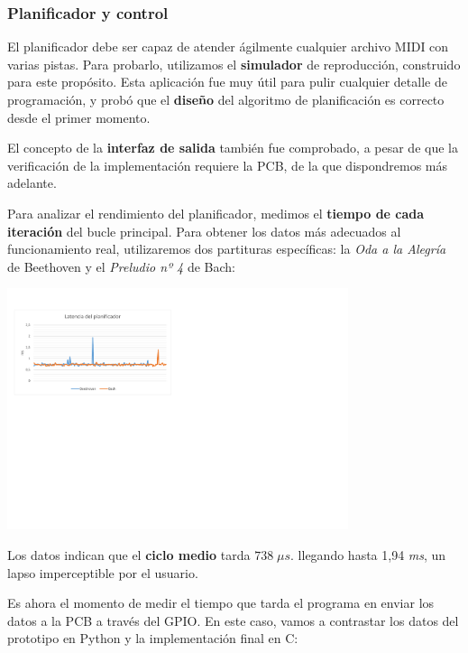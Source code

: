 \documentclass[10pt,a4paper]{article}
\begin{document}
	\subsubsection*{Planificador y control}
	
	El planificador debe ser capaz de atender ágilmente cualquier archivo MIDI con varias pistas. Para probarlo, utilizamos el \textbf{simulador} de reproducción, construido para este propósito. Esta aplicación fue muy útil para pulir cualquier detalle de programación, y probó que el \textbf{diseño} del algoritmo de planificación es correcto desde el primer momento.
	
	El concepto de la \textbf{interfaz de salida} también fue comprobado, a pesar de que la verificación de la implementación requiere la PCB, de la que dispondremos más adelante.
	
	Para analizar el rendimiento del planificador, medimos el \textbf{tiempo de cada iteración} del bucle principal. Para obtener los datos más adecuados al funcionamiento real, utilizaremos dos partituras específicas: la \textit{Oda a la Alegría} de Beethoven y el \textit{Preludio nº 4} de Bach:
	
	\begin{center}
		\includegraphics[width=0.75\textwidth]{images/lat_sched} 
	\end{center}
	
	Los datos indican que el \textbf{ciclo medio} tarda $738 \; \mu s$. llegando hasta 1,94 \textit{ms}, un lapso imperceptible por el usuario.
	
	Es ahora el momento de medir el tiempo que tarda el programa en enviar los datos a la PCB a través del GPIO. En este caso, vamos a contrastar los datos del prototipo en Python y la implementación final en C:
	
\end{document}
